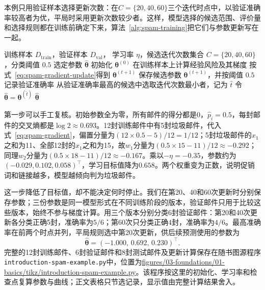 本例只用验证样本选择更新次数：在$C=\{20,40,60\}$三个迭代时点中，以验证准确率较高者为优，平局时采用更新次数较少者。这样，模型选择的候选范围、评价量和选择规则都在训练前确定下来，算法~\ref{alg:spam-training}把它们与参数更新写在一起。

\begin{algorithm}[垃圾邮件分类器的训练]
  \label{alg:spam-training}
  \begin{algorithmic}[1]
    \Require 训练样本 $D_{\mathrm{train}}$，验证样本 $D_{\mathrm{val}}$，
      学习率 $\eta$，候选迭代次数集合 $C=\{20,40,60\}$，分类阈值 $0.5$
    \Ensure 选定参数 $\hat{\bm{\theta}}$
    \State 初始化 $\bm{\theta}^{(0)}$
      \State 在训练样本上计算经验风险及其梯度
      \State 按式~\eqref{eq:spam-gradient-update}得到 $\bm{\theta}^{(t+1)}$
        \State 保存候选参数 $\bm{\theta}^{(t+1)}$，并按阈值 $0.5$ 记录验证准确率
      \EndIf
    \EndFor
    \State 从验证准确率最高的候选中选取迭代次数最小者，记为 $\hat t$
    \State 令 $\hat{\bm{\theta}}=\bm{\theta}^{(\hat t)}$
    \State \Return $\hat{\bm{\theta}}$
  \end{algorithmic}
\end{algorithm}

第一步可以手工复核。初始参数全为零，所有邮件的得分都是$0$，$\hat{p}_i=0.5$，每封邮件的交叉熵都是$\log 2\approx0.693$。12封训练邮件中有5封垃圾邮件，代入式~\eqref{eq:spam-gradient}，偏置分量为$(12\times0.5-5)/12=1/12$；5封垃圾邮件的$x_1$之和为11、全部12封的$x_1$之和为15，故$w_1$分量为$(0.5\times15-11)/12\approx-0.292$；同理$w_2$分量为$(0.5\times18-11)/12\approx-0.167$。乘以$-\eta=-0.35$，参数约为$(-0.029,0.102,0.058)^{\top}$，学习目标值降为$0.658$。两个权重变为正数，说明促销词和链接越多，模型越倾向判为垃圾邮件。

这一步降低了目标值，却不能决定何时停止。我们在第20、40和60次更新时分别保存参数；三份参数是同一模型形式在不同训练阶段的版本，验证邮件只用于比较这些版本，始终不参与梯度计算。用三个版本分别分类6封验证邮件：第20和40次更新各分类正确5封，准确率为$5/6$；第60次只分类正确4封，准确率为$4/6$。最高准确率在前两个时点并列，平局规则选中第20次更新，供后续预测使用的参数为
\begin{equation}
  \hat{\bm{\theta}}=(-1.000,\,0.692,\,0.230)^{\top}.
  \label{eq:spam-fitted-parameters}
\end{equation}
完整的12封训练邮件、6封验证邮件和8封测试邮件及更新计算保存在随书图源程序\texttt{introduction-spam-example.py}中，位置为\url{figures/03-foundations/01-basics/tikz/introduction-spam-example.py}。该程序按这里的初始化、学习率和检查点复算参数与曲线；正文表格只节选记录，显示值由完整计算结果舍入。


